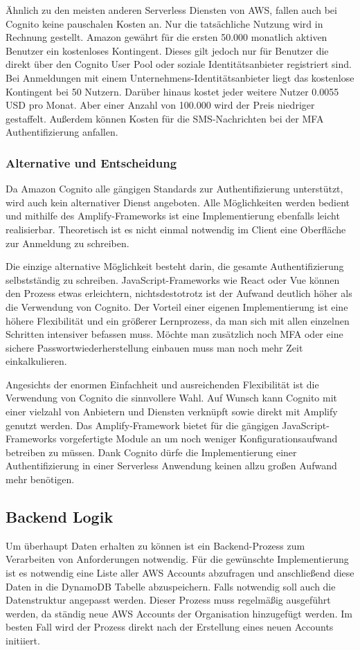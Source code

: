 {Ähnlich zu den meisten anderen Serverless Diensten von AWS, fallen auch bei Cognito keine pauschalen Kosten an.
Nur die tatsächliche Nutzung wird in Rechnung gestellt. Amazon gewährt für die ersten 50.000 monatlich aktiven Benutzer ein kostenloses Kontingent.
Dieses gilt jedoch nur für Benutzer die direkt über den Cognito User Pool oder soziale Identitätsanbieter registriert sind.
Bei Anmeldungen mit einem Unternehmens-Identitätsanbieter liegt das kostenlose Kontingent bei 50 Nutzern.
Darüber hinaus kostet jeder weitere Nutzer 0.0055 USD pro Monat. Aber einer Anzahl von 100.000 wird der Preis niedriger gestaffelt.
Außerdem können Kosten für die SMS-Nachrichten bei der MFA Authentifizierung anfallen.  \cite[]{CognitoPreise}


\subsubsection{Alternative und Entscheidung}

Da Amazon Cognito alle gängigen Standards zur Authentifizierung unterstützt, wird auch kein alternativer Dienst angeboten.
Alle Möglichkeiten werden bedient und mithilfe des Amplify-Frameworks ist eine Implementierung ebenfalls leicht realisierbar.
Theoretisch ist es nicht einmal notwendig im Client eine Oberfläche zur Anmeldung zu schreiben.

Die einzige alternative Möglichkeit besteht darin, die gesamte Authentifizierung selbstständig zu schreiben.
JavaScript-Frameworks wie React oder Vue können den Prozess etwas erleichtern, nichtsdestotrotz ist der Aufwand deutlich höher als die Verwendung von Cognito.
Der Vorteil einer eigenen Implementierung ist eine höhere Flexibilität und ein größerer Lernprozess, da man sich mit allen einzelnen Schritten intensiver befassen muss.
Möchte man zusätzlich noch MFA oder eine sichere Passwortwiederherstellung einbauen muss man noch mehr Zeit einkalkulieren.

Angesichts der enormen Einfachheit und ausreichenden Flexibilität ist die Verwendung von Cognito die sinnvollere Wahl.
Auf Wunsch kann Cognito mit einer vielzahl von Anbietern und Diensten verknüpft sowie direkt mit Amplify genutzt werden.
Das Amplify-Framework bietet für die gängigen JavaScript-Frameworks vorgefertigte Module an um noch weniger Konfigurationsaufwand betreiben zu müssen.
Dank Cognito dürfe die Implementierung einer Authentifizierung in einer Serverless Anwendung keinen allzu großen Aufwand mehr benötigen.


\subsection{Backend Logik}
Um überhaupt Daten erhalten zu können ist ein Backend-Prozess zum Verarbeiten von Anforderungen notwendig.
Für die gewünschte Implementierung ist es notwendig eine Liste aller AWS Accounts abzufragen und anschließend diese Daten in die DynamoDB Tabelle abzuspeichern. Falls notwendig soll auch die Datenstruktur angepasst werden.
Dieser Prozess muss regelmäßig ausgeführt werden, da ständig neue AWS Accounts der Organisation hinzugefügt werden.
Im besten Fall wird der Prozess direkt nach der Erstellung eines neuen Accounts initiiert.

}

